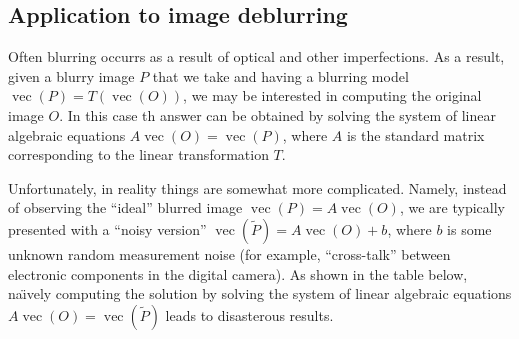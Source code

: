\documentclass[10pt,a4paper]{article}
\theoremstyle{plain}
\theoremstyle{definition}
\DeclareMathOperator{\vc}{vec}
\begin{document}
\subsection*{Application to image deblurring}
Often blurring occurrs as a result of optical and other imperfections.  As a result, given a blurry image \(P\) that we take and having a blurring model
\(\vc(P) = T(\vc(O))\), we may be interested in computing the original image \(O\).
In this case th answer can be obtained by solving  the system of linear algebraic equations \(A\vc(O) = \vc(P)\), where \(A\) is the standard matrix corresponding to the linear transformation \(T\).

Unfortunately, in reality things are somewhat more complicated.
Namely, instead of observing the ``ideal'' blurred image \(\vc(P)=A\vc(O)\),
we are typically presented with a ``noisy version''  \(\vc(\tilde{P})=A\vc(O) + b\), where \(b\) is some unknown random measurement noise (for example, ``cross-talk'' between electronic components in the digital camera).
As shown in the table below, na{\"\i}vely computing the solution by solving the system of linear algebraic equations \(A\vc(O) = \vc(\tilde{P})\) leads to disasterous results.
\end{document}
